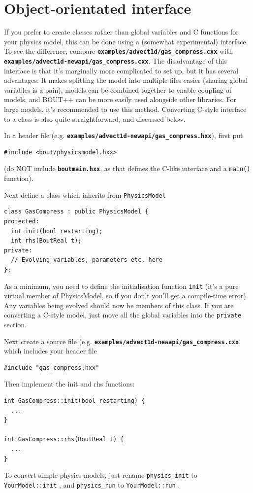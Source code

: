 \documentclass[12pt]{article}
\newcommand{\file}[1]{\texttt{\bf #1}}
\begin{document}
\section{Object-orientated interface}
%
\label{sec:newapi}
%
If you prefer to create classes rather than global variables and C functions
for your physics model, this can be done using a (somewhat experimental)
interface. To see the difference, compare
\file{examples/advect1d/gas\_compress.cxx} with\\
\file{examples/advect1d-newapi/gas\_compress.cxx}. The disadvantage of this
interface is that it's marginally more complicated to set up, but it has
several advantages: It makes splitting the model into multiple files easier
(sharing global variables is a pain), models can be combined together to enable
coupling of models, and BOUT++ can be more easily used alongside other
libraries.  For large models, it's recommended to use this method. Converting
C-style interface to a class is also quite straightforward, and discussed
below.

In a header file (e.g. \file{examples/advect1d-newapi/gas\_compress.hxx}),
first put
%
\begin{lstlisting}
#include <bout/physicsmodel.hxx>
\end{lstlisting}
%
(do NOT include \file{boutmain.hxx}, as that defines the C-like interface and a
%
\lstinline!main()!
%
 function).

Next define a class which inherits from
%
\lstinline!PhysicsModel!
%
\begin{lstlisting}
class GasCompress : public PhysicsModel {
protected:
  int init(bool restarting);
  int rhs(BoutReal t);
private:
  // Evolving variables, parameters etc. here
};
\end{lstlisting}
%
As a minimum, you need to define the initialisation function
%
\lstinline!init!
%
 (it's a pure virtual member of PhysicsModel, so if you don't you'll get a
 compile-time error). Any variables being evolved should now be members of this
 class. If you are converting a C-style model, just move all the global
 variables into the
%
\lstinline!private!
%
 section.

Next create a source file (e.g.
\file{examples/advect1d-newapi/gas\_compress.cxx}, which includes your header
file
%
\begin{lstlisting}
#include "gas_compress.hxx"
\end{lstlisting}
%
Then implement the init and rhs functions:
%
\begin{lstlisting}
int GasCompress::init(bool restarting) {
  ...
}

int GasCompress::rhs(BoutReal t) {
  ...
}
\end{lstlisting}
%
To convert simple physics models, just rename
%
\lstinline!physics_init! to \lstinline!YourModel::init!
%
, and
%
\lstinline!physics_run! to \lstinline!YourModel::run!
%
.
\end{document}
